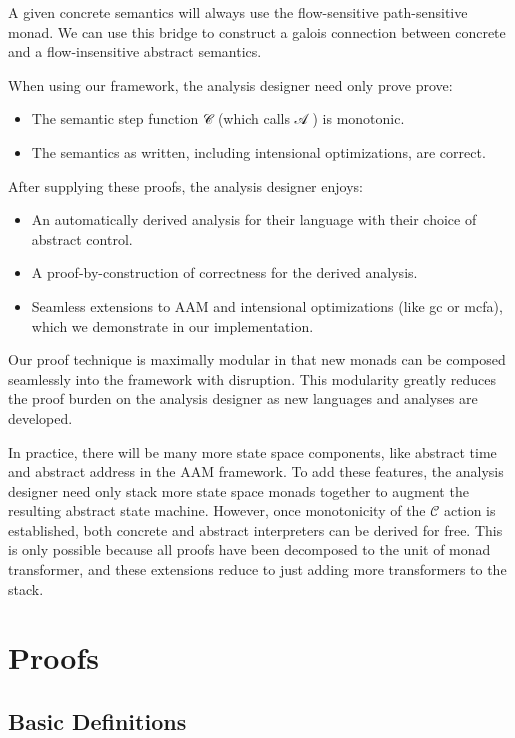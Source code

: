 \documentclass{article}
\begin{document}
A given concrete semantics will always use the flow-sensitive path-sensitive monad.
We can use this bridge to construct a galois connection between concrete and a flow-insensitive abstract semantics.

When using our framework, the analysis designer need only prove prove:
\begin{itemize}
\item The semantic step function 𝒞 (which calls 𝒜 ) is monotonic.
\item The semantics as written, including intensional optimizations, are correct.
\end{itemize}
After supplying these proofs, the analysis designer enjoys:
\begin{itemize}
\item An automatically derived analysis for their language with their choice of abstract control.
\item A proof-by-construction of correctness for the derived analysis.
\item 
  Seamless extensions to AAM and intensional optimizations (like gc or mcfa), which we demonstrate in our implementation.
\end{itemize}

Our proof technique is maximally modular in that new monads can be composed seamlessly into the framework with disruption.
This modularity greatly reduces the proof burden on the analysis designer as new languages and analyses are developed.

In practice, there will be many more state space components, like abstract time and abstract address in the AAM framework.
To add these features, the analysis designer need only stack more state space monads together to augment the resulting abstract state machine.
However, once monotonicity of the $𝒞$ action is established, both concrete and abstract interpreters can be derived for free.
This is only possible because all proofs have been decomposed to the unit of monad transformer, and these extensions reduce to just adding more transformers to the stack.



\section{Proofs}
\label{section:Proofs}

\subsection{Basic Definitions}
\label{section:Proofs:BasicDefinitions}
\end{document}
